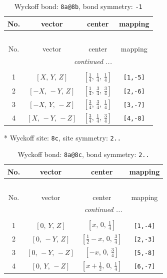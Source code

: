 \documentclass[fleqn,8pt]{jsarticle}
\begin{document}
\begin{longtable}{cccc}
\caption{Wyckoff bond: {\tt 8a@8b}, bond symmetry: {\tt -1}}
 \\
 \hline \hline
No. & vector & center & mapping \\ \hline \endfirsthead

\multicolumn{3}{l}{\tablename\ \thetable{}} \\
 \hline \hline
No. & vector & center & mapping \\ \hline \endhead

 \hline \hline
\multicolumn{3}{r}{\footnotesize\it continued ...} \\ \endfoot

 \hline \hline
\multicolumn{3}{r}{} \\ \endlastfoot

1 & $\left[ X,\, Y,\, Z \right]$ & $\left[ \frac{1}{4},\, \frac{1}{4},\, \frac{1}{4} \right]$ & {\tt [1,-5]} \\ \hline
2 & $\left[ - X,\, - Y,\, Z \right]$ & $\left[ \frac{1}{4},\, \frac{3}{4},\, \frac{3}{4} \right]$ & {\tt [2,-6]} \\ \hline
3 & $\left[ - X,\, Y,\, - Z \right]$ & $\left[ \frac{3}{4},\, \frac{3}{4},\, \frac{1}{4} \right]$ & {\tt [3,-7]} \\ \hline
4 & $\left[ X,\, - Y,\, - Z \right]$ & $\left[ \frac{3}{4},\, \frac{1}{4},\, \frac{3}{4} \right]$ & {\tt [4,-8]} \\
\end{longtable}
* Wyckoff site: {\tt 8c}, site symmetry: {\tt 2..}
\renewcommand{\arraystretch}{1.2}
\begin{longtable}{cccc}
\caption{Wyckoff bond: {\tt 8a@8c}, bond symmetry: {\tt 2..}}
 \\
 \hline \hline
No. & vector & center & mapping \\ \hline \endfirsthead

\multicolumn{3}{l}{\tablename\ \thetable{}} \\
 \hline \hline
No. & vector & center & mapping \\ \hline \endhead

 \hline \hline
\multicolumn{3}{r}{\footnotesize\it continued ...} \\ \endfoot

 \hline \hline
\multicolumn{3}{r}{} \\ \endlastfoot

1 & $\left[ 0,\, Y,\, Z \right]$ & $\left[ x,\, 0,\, \frac{1}{4} \right]$ & {\tt [1,-4]} \\ \hline
2 & $\left[ 0,\, - Y,\, Z \right]$ & $\left[ \frac{1}{2} - x,\, 0,\, \frac{3}{4} \right]$ & {\tt [2,-3]} \\ \hline
3 & $\left[ 0,\, - Y,\, - Z \right]$ & $\left[ - x,\, 0,\, \frac{3}{4} \right]$ & {\tt [5,-8]} \\ \hline
4 & $\left[ 0,\, Y,\, - Z \right]$ & $\left[ x + \frac{1}{2},\, 0,\, \frac{1}{4} \right]$ & {\tt [6,-7]} \\
\end{longtable}
\end{document}

